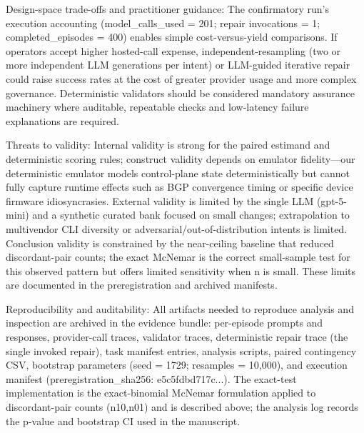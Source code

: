 \documentclass[conference]{IEEEtran}
\begin{document}
Design-space trade-offs and practitioner guidance: The confirmatory run's execution accounting (model\_calls\_used = 201; repair invocations = 1; completed\_episodes = 400) enables simple cost-versus-yield comparisons. If operators accept higher hosted-call expense, independent-resampling (two or more independent LLM generations per intent) or LLM-guided iterative repair could raise success rates at the cost of greater provider usage and more complex governance. Deterministic validators should be considered mandatory assurance machinery where auditable, repeatable checks and low-latency failure explanations are required.

Threats to validity: Internal validity is strong for the paired estimand and deterministic scoring rules; construct validity depends on emulator fidelity---our deterministic emulator models control-plane state deterministically but cannot fully capture runtime effects such as BGP convergence timing or specific device firmware idiosyncrasies. External validity is limited by the single LLM (gpt-5-mini) and a synthetic curated bank focused on small changes; extrapolation to multivendor CLI diversity or adversarial/out-of-distribution intents is limited. Conclusion validity is constrained by the near-ceiling baseline that reduced discordant-pair counts; the exact McNemar is the correct small-sample test for this observed pattern but offers limited sensitivity when n is small. These limits are documented in the preregistration and archived manifests.

Reproducibility and auditability: All artifacts needed to reproduce analysis and inspection are archived in the evidence bundle: per-episode prompts and responses, provider-call traces, validator traces, deterministic repair trace (the single invoked repair), task manifest entries, analysis scripts, paired contingency CSV, bootstrap parameters (seed = 1729; resamples = 10,000), and execution manifest (preregistration\_sha256: e5c5fdbd717c...). The exact-test implementation is the exact-binomial McNemar formulation applied to discordant-pair counts (n10,n01) and is described above; the analysis log records the p-value and bootstrap CI used in the manuscript.
\end{document}
